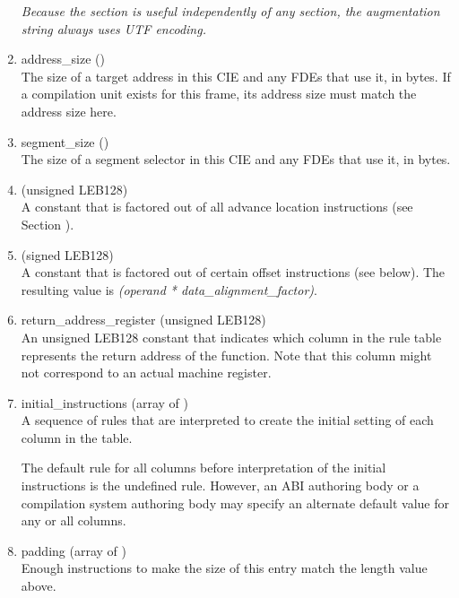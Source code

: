 \begin{enumerate}[1. ]
\textit{Because the  section is useful independently of
any  section, the augmentation string always uses
UTF encoding.}

\item  address\_size () \\
The size of a target address
in this CIE and any FDEs that
use it, in bytes. If a compilation unit exists for this frame,
its address size must match the address size here.

\item  segment\_size () \\
The 
size of a segment selector in this CIE and any FDEs that
use it, in bytes.

\item  {} (unsigned LEB128) 
 \\
A 
constant that is factored out of all advance location
instructions (see 
Section ).


\item  {} (signed LEB128)
 \\
A 
constant that is factored out of certain offset instructions
(see below). The resulting value is  \textit{(operand *
data\_alignment\_factor)}.

\item  return\_address\_register (unsigned LEB128) \\
An unsigned LEB128 constant that indicates which column in the
rule table represents the return address of the function. Note
that this column might not correspond to an actual machine
register.

\item initial\_instructions (array of ) \\
A sequence of rules that are interpreted to create the initial
setting of each column in the table.  

The default rule for
all columns before interpretation of the initial instructions
is the undefined rule. However, an ABI authoring body or a
compilation system authoring body may specify an alternate
default value for any or all columns.

\item padding (array of ) \\
Enough  instructions to make the size of this entry
match the length value above.
\end{enumerate}

